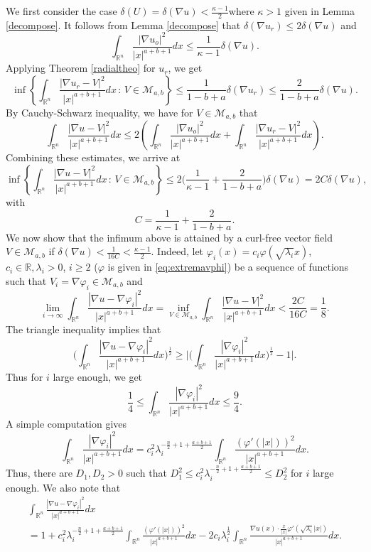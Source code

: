 \documentclass[a4paper,12pt]{article}
\theoremstyle{plain}
\theoremstyle{definition}
\theoremstyle{remark}
\def\R{\mathbb R}%
\def\de{\delta}%
\def\lam{\lambda}%
\def\na{\nabla}%
\def\lt{\left}%
\def\rt{\right}%
\def\irn{\int_{\R^n}}
\numberwithin{equation}{section}
\begin{document}
We first consider the case $\delta(U) = \delta(\nabla u) <\frac{\kappa-1}{2}$where $\kappa>1$ given in  Lemma \ref{decompose}. It follows from Lemma \ref{decompose} that $
\delta(\nabla u_r) \leq 2 \delta(\nabla u)$ and 
$$ \irn \frac{|\nabla u_o|^2}{|x|^{a+b+1}} dx \leq \frac{1}{\kappa -1} \delta(\nabla u).$$
 Applying Theorem \ref{radialtheo} for $u_r$, we get
$$ \inf\left\{\irn \frac{|\nabla u_r - V|^2}{|x|^{a+b+1}} dx\, :\, V \in \mathcal M_{a,b}\right\}\leq \frac{1}{1-b+a}\delta(\nabla u_r) \leq \frac{2}{1-b+a} \delta(\nabla u).$$
 By Cauchy-Schwarz inequality, we have for $V \in \mathcal M_{a,b}$ that
\[
\irn \frac{|\nabla u - V|^2}{|x|^{a+b+1}} dx \leq 2\lt(\irn \frac{|\nabla u_o|^2}{|x|^{a+b+1}} dx +\irn \frac{|\nabla u_r - V|^2}{|x|^{a+b+1}} dx\rt).
\]
Combining these estimates, we arrive at
\begin{equation}\label{eb1}
	 \inf\left\{\irn \frac{|\nabla u - V|^2}{|x|^{a+b+1}} dx\, :\, V \in \mathcal M_{a,b}\right\}  \leq 2\Big(\frac1{\kappa -1} + \frac2{1-b+a}\Big) \de(\nabla u)=2C \delta(\nabla u),
\end{equation}
with 
\[
C = \frac1{\kappa -1} + \frac2{1-b+a}.
\]
We now show that the infimum above is attained by a curl-free vector field  $V\in \mathcal M_{a,b}$ if $\delta(\nabla u) < \frac1{16 C}<\frac{\kappa-1}{2}.$ Indeed, let $\varphi_i(x) = c_i \varphi(\sqrt{\lambda_i} x)$, $c_i\in \R, \lambda_i>0$, $i\geq 2$ ($\varphi$ is given in \eqref{eq:extremavphi}) be a sequence of functions such that $V_i =\nabla \varphi_i\in \mathcal M_{a,b}$ and
$$\lim_{i\to \infty} \irn \frac{|\na u -\na \varphi_i|^2}{|x|^{a+b+1}} dx = \inf_{V \in \mathcal{M}_{a,b}} \irn \frac{|\na u -V|^2}{|x|^{a+b+1}} dx < \frac{2C}{16C}=\frac18.$$
The  triangle inequality implies that 
$$\Big(\irn \frac{|\na u -\na \varphi_i|^2}{|x|^{a+b+1}} dx\Big)^{\frac12} \geq \Big| \Big(\irn \frac{|\na \varphi_i|^2}{|x|^{a+b+1}} dx\Big)^{\frac12} -1\Big|.$$
Thus for $i$ large enough, we get
$$\frac14 \leq \irn \frac{|\na \varphi_i|^2 }{|x|^{a+b+1}}dx \leq \frac 94.$$
A simple computation gives
$$\irn \frac{|\na \varphi_i|^2 }{|x|^{a+b+1}}dx = c_i^2 \lam_i^{-\frac n2 +1+\frac{a+b+1}{2}} \irn\frac{( \varphi'(|x|))^2 }{|x|^{a+b+1}}dx.$$
Thus, there are $D_1, D_2 >0$ such that $D_1^2 \leq c_i^2 \lam_i^{-\frac n2 + 1+\frac{a+b+1}{2}}\leq D_2^2$ for $i$ large enough. We also note that
\begin{multline}\label{eq:expan}
	\irn\frac{ |\na u -\na \varphi_i|^2}{|x|^{a+b+1}} dx \\= 1 + c_i^2 \lam_i^{-\frac n2 + 1+\frac{a+b+1}{2}}\irn \frac{( \varphi'(|x|))^2 }{|x|^{a+b+1}}dx -2c_i \lam_i^{\frac12} \irn \frac{\na u(x) \cdot \frac x{|x|} \varphi'(\sqrt{\lambda_i}|x|)}{|x|^{a+b+1}}dx.
\end{multline}
\end{document}
